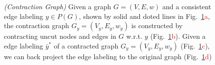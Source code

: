 \begin{center}
\begin{figure}[h]
\caption{\emph{(Contraction Graph)} 
Given a graph $G=(V, E, w)$ and a consistent edge labeling $y\in P(G)$, shown by solid and doted lines in Fig.~\ref{fig:contraction}\textcolor{red}{a}, the contraction 
graph  $G_y=(V_y,E_y, w_y) $ is constructed by contracting uncut nodes and edges in $G$ w.r.t. $y$ (Fig.~\ref{fig:contraction}\textcolor{red}{b}).
Given a edge labeling $\bar{y}^*$ of a contracted graph $G_y=(V_y,E_y, w_y)$ (Fig.~\ref{fig:contraction}\textcolor{red}{c}),
we can back project the edge labeling to the original graph (Fig.~\ref{fig:contraction}\textcolor{red}{d})
}\label{fig:contraction}
\end{figure}
\end{center}



